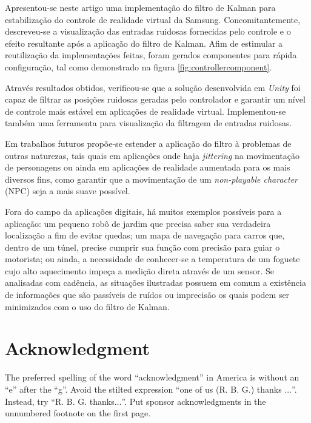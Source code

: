 \documentclass[conference]{IEEEtran}
\begin{document}
Apresentou-se neste artigo uma implementação do filtro de Kalman para estabilização do controle de realidade virtual da Samsung. Concomitantemente, descreveu-se a visualização das entradas ruidosas fornecidas pelo controle e o efeito resultante após a aplicação do filtro de Kalman. Afim de estimular a reutilização da implementações feitas, foram gerados componentes para rápida configuração, tal como demonstrado na figura \ref{fig:controllercomponent}.


Através resultados obtidos, verificou-se que a solução desenvolvida em \textit{Unity} foi capaz de filtrar as posições ruidosas geradas pelo controlador e garantir um nível de controle mais estável em aplicações de realidade virtual. Implementou-se também uma ferramenta para visualização da filtragem de entradas ruidosas.


Em trabalhos futuros propõe-se estender a aplicação do filtro à problemas de outras naturezas, tais quais em aplicações onde haja \textit{jittering} na movimentação de personagens ou ainda em aplicações de realidade aumentada para os mais diversos fins, como garantir que a movimentação de um \textit{non-playable character} (NPC) seja a mais suave possível.


Fora do campo da aplicações digitais, há muitos exemplos possíveis para a aplicação:  um pequeno robô de jardim que precisa saber sua verdadeira localização a fim de evitar quedas; um mapa de navegação para carros que, dentro de um túnel, precise cumprir sua função com precisão para guiar o motorista; ou ainda, a necessidade de conhecer-se a temperatura de um foguete cujo alto aquecimento impeça a medição direta através de um sensor. Se analisadas com cadência, as situações ilustradas possuem em comum a existência de informações que são passíveis de ruídos ou imprecisão os quais podem ser minimizados com o uso do filtro de Kalman.

\section*{Acknowledgment}

The preferred spelling of the word ``acknowledgment'' in America is without 
an ``e'' after the ``g''. Avoid the stilted expression ``one of us (R. B. 
G.) thanks $\ldots$''. Instead, try ``R. B. G. thanks$\ldots$''. Put sponsor 
acknowledgments in the unnumbered footnote on the first page.



\end{document}

